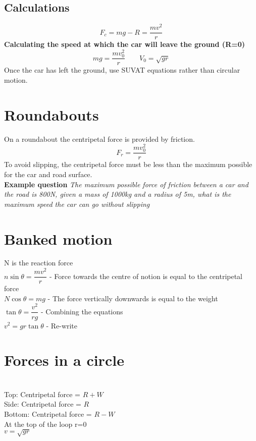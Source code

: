 \documentclass{article}[18pt]
\begin{document}
\subsection{Calculations}
$$F_c=mg-R=\frac{mv^2}{r}$$
\textbf{Calculating the speed at which the car will leave the ground (R=0)}\\
$$mg=\frac{mv_0^2}{r} \qquad V_0=\sqrt{gr}$$
Once the car has left the ground, use SUVAT equations rather than circular motion.
\section{Roundabouts}
On a roundabout the centripetal force is provided by friction.\\
$$F_r=\frac{mv_0^2}{r}$$
To avoid slipping, the centripetal force must be less than the maximum possible for the car and road surface.\\
\textbf{Example question}
\textit{The maximum possible force of friction between a car and the road is 800N, given a mass of 1000kg and a radius of 5m, what is the maximum speed the car can go without slipping}
\newpage
\section{Banked motion}
N is the reaction force\\
$n\sin\theta=\dfrac{mv^2}{r}$ - Force towards the centre of notion is equal to the centripetal force\\
$N\cos\theta=mg$ - The force vertically downwards is equal to the weight\\
$\tan\theta=\dfrac{v^2}{rg}$ - Combining the equations\\
$v^2=gr\tan\theta$ - Re-write
\section{Forces in a circle}
\\
Top: Centripetal force = $R+W$\\
Side: Centripetal force = $R$\\
Bottom: Centripetal force = $R-W$\\
At the top of the loop r=0\\
$v=\sqrt{gr}$
\end{document}
